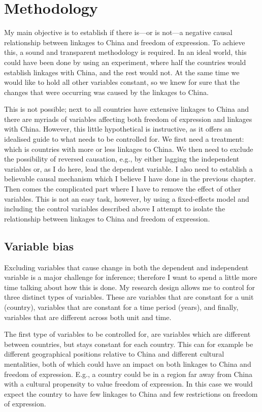 \section{Methodology}
My main objective is to establish if there is---or is not---a negative causal relationship between linkages to China and freedom of expression. To achieve this, a sound and transparent methodology is required. In an ideal world, this could have been done by using an experiment, where half the countries would establish linkages with China, and the rest would not. At the same time we would like to hold all other variables constant, so we knew for sure that the changes that were occurring was caused by the linkages to China.

This is not possible; next to all countries have extensive linkages to China and there are myriads of variables affecting both freedom of expression and linkages with China. However, this little hypothetical is instructive, as it offers an idealised guide to what needs to be controlled for. We first need a treatment: which is countries with more or less linkages to China. We then need to exclude the possibility of reversed causation, e.g., by either lagging the independent variables or, as I do here, lead the dependent variable. I also need to establish a believable causal mechanism which I believe I have done in the previous chapter. Then comes the complicated part where I have to remove the effect of other variables. This is not an easy task, however, by using a fixed-effects model and including the control variables described above I attempt to isolate the relationship between linkages to China and freedom of expression.

\subsection{Variable bias}
Excluding variables that cause change in both the dependent and independent variable is a major challenge for inference; therefore I want to spend a little more time talking about how this is done. My research design allows me to control for three distinct types of variables. These are variables that are constant for a unit (country), variables that are constant for a time period (years), and finally, variables that are different across both unit and time. 

The first type of variables to be controlled for, are variables which are different between countries, but stays constant for each country. This can for example be different geographical positions relative to China and different cultural mentalities, both of which could have an impact on both linkages to China and freedom of expression. E.g., a country could be in a region far away from China with a cultural propensity to value freedom of expression. In this case we would expect the country to have few linkages to China and few restrictions on freedom of expression.

